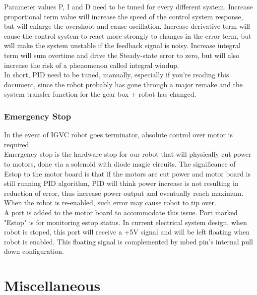 \documentclass[letterpaper, 12pt]{article}
\begin{document}
Parameter values P, I and D need to be tuned for every different system. Increase proportional term value will increase the speed of the control system response, but will enlarge the overshoot and cause oscillation. Increase derivative term will cause the control system to react more strongly to changes in the error term, but will make the system unstable if the feedback signal is noisy. Increase integral term will sum overtime and drive the Steady-state error to zero, but will also increase the risk of a phenomenon called integral windup. \\

In short, PID need to be tuned, manually, especially if you're reading this document, since the robot probably has gone through a major remake and the system transfer function for the gear box + robot has changed.

\subsubsection{Emergency Stop}
In the event of IGVC robot goes terminator, absolute control over motor is required.\\

Emergency stop is the hardware stop for our robot that will physically cut power to motors, done via a solenoid with diode magic circuits. The significance of Estop to the motor board is that if the motors are cut power and motor board is still running PID algorithm, PID will think power increase is not resulting in reduction of error, thus increase power output and eventually reach maximum. When the robot is re-enabled, such error may cause robot to tip over. \\

A port is added to the motor board to accommodate this issue. Port marked "Estop" is for monitoring estop status. In current electrical system design, when robot is stoped, this port will receive a +5V signal and will be left floating when robot is enabled. This floating signal is complemented by mbed pin's internal pull down configuration. 

\section{Miscellaneous}
\end{document}
